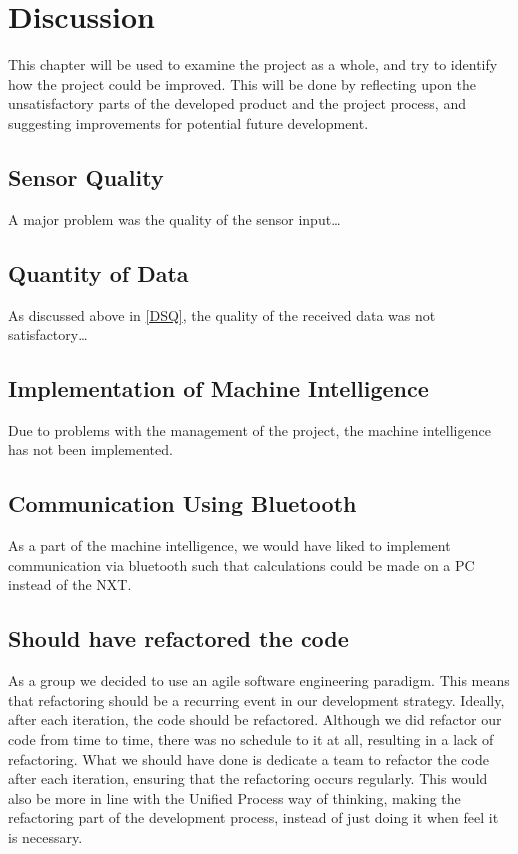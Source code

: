 \chapter{Discussion}\label{projDiscus}
This chapter will be used to examine the project as a whole, and try to identify
how the project could be improved. This will be done by reflecting upon the
unsatisfactory parts of the developed product and the project process, and
suggesting improvements for potential future development.

\section{Sensor Quality}\label{DSQ}
A major problem was the quality of the sensor input\ldots

\section{Quantity of Data}
As discussed above in \autoref{DSQ}, the quality of the received data was not
satisfactory\ldots

\section{Implementation of Machine Intelligence}
Due to problems with the management of the project, the machine intelligence has
not been implemented.

\section{Communication Using Bluetooth}
As a part of the machine intelligence, we would have liked to implement
communication via bluetooth such that calculations could be made on a PC instead
of the NXT.

\section{Should have refactored the code}
As a group we decided to use an agile software engineering paradigm. This means that
refactoring should be a recurring event in our development strategy. Ideally, after each iteration, the code should be refactored. Although we did refactor our code from time to time, there was no schedule to it at all, resulting in a lack of refactoring. What we should have done is dedicate a team to refactor the code after each iteration, ensuring that the refactoring occurs regularly. This would also be more in line with the Unified Process way of thinking, making the refactoring part of the development process, instead of just doing it when feel it is necessary.

